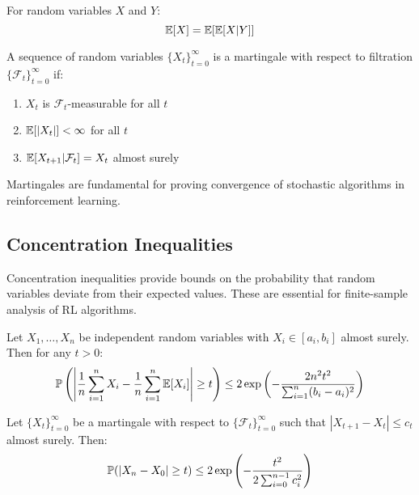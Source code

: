 \begin{theorem}
For random variables $X$ and $Y$:
\begin{equation}
\mathbb{E}[X] = \mathbb{E}[\mathbb{E}[X|Y]]
\end{equation}
\end{theorem}

\begin{definition}[Martingale]
A sequence of random variables $\{X_t\}_{t=0}^\infty$ is a martingale with respect to filtration $\{\mathcal{F}_t\}_{t=0}^\infty$ if:
\begin{enumerate}
    \item $X_t$ is $\mathcal{F}_t$-measurable for all $t$
    \item $\mathbb{E}[|X_t|] < \infty$ for all $t$
    \item $\mathbb{E}[X_{t+1}|\mathcal{F}_t] = X_t$ almost surely
\end{enumerate}
\end{definition}

Martingales are fundamental for proving convergence of stochastic algorithms in reinforcement learning.

\subsection{Concentration Inequalities}

Concentration inequalities provide bounds on the probability that random variables deviate from their expected values. These are essential for finite-sample analysis of RL algorithms.

\begin{theorem}
Let $X_1, \ldots, X_n$ be independent random variables with $X_i \in [a_i, b_i]$ almost surely. Then for any $t > 0$:
\begin{equation}
\mathbb{P}\left(\left|\frac{1}{n}\sum_{i=1}^n X_i - \frac{1}{n}\sum_{i=1}^n \mathbb{E}[X_i]\right| \geq t\right) \leq 2\exp\left(-\frac{2n^2t^2}{\sum_{i=1}^n(b_i-a_i)^2}\right)
\end{equation}
\end{theorem}

\begin{theorem}
Let $\{X_t\}_{t=0}^\infty$ be a martingale with respect to $\{\mathcal{F}_t\}_{t=0}^\infty$ such that $|X_{t+1} - X_t| \leq c_t$ almost surely. Then:
\begin{equation}
\mathbb{P}(|X_n - X_0| \geq t) \leq 2\exp\left(-\frac{t^2}{2\sum_{i=0}^{n-1}c_i^2}\right)
\end{equation}
\end{theorem}

